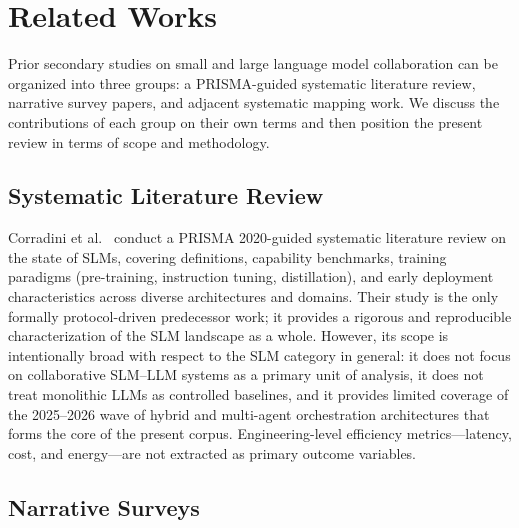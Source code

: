 \section{Related Works}
\label{sec:related}

Prior secondary studies on small and large language model collaboration can be organized into three groups: a PRISMA-guided systematic literature review, narrative survey papers, and adjacent systematic mapping work. We discuss the contributions of each group on their own terms and then position the present review in terms of scope and methodology.

\subsection{Systematic Literature Review}

Corradini et al.~\cite{slmreview2025prisma} conduct a PRISMA 2020-guided systematic literature review on the state of SLMs, covering definitions, capability benchmarks, training paradigms (pre-training, instruction tuning, distillation), and early deployment characteristics across diverse architectures and domains. Their study is the only formally protocol-driven predecessor work; it provides a rigorous and reproducible characterization of the SLM landscape as a whole. However, its scope is intentionally broad with respect to the SLM category in general: it does not focus on collaborative SLM--LLM systems as a primary unit of analysis, it does not treat monolithic LLMs as controlled baselines, and it provides limited coverage of the 2025--2026 wave of hybrid and multi-agent orchestration architectures that forms the core of the present corpus. Engineering-level efficiency metrics---latency, cost, and energy---are not extracted as primary outcome variables.

\subsection{Narrative Surveys}


